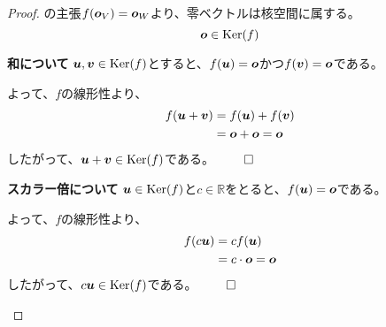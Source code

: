 \documentclass[../../../topic_linear-algebra]{subfiles}
\begin{document}
\begin{proof}
  の主張$f(\vb*{o}_V) = \vb*{o}_W$より、零ベクトルは核空間に属する。
  \begin{equation*}
    \vb*{o} \in \operatorname{Ker}(f)
  \end{equation*}

  \begin{subpattern}{\bfseries 和について}
    $\vb*{u}, \vb*{v} \in \operatorname{Ker}(f)$とすると、$f(\vb*{u}) = \vb*{o}$かつ$f(\vb*{v}) = \vb*{o}$である。

    よって、$f$の線形性より、
    \begin{align*}
      f(\vb*{u} + \vb*{v}) & = f(\vb*{u}) + f(\vb*{v})     \\
                           & = \vb*{o} + \vb*{o} = \vb*{o}
    \end{align*}
    したがって、$\vb*{u} + \vb*{v} \in \operatorname{Ker}(f)$である。 $\qed$
  \end{subpattern}

  \begin{subpattern}{\bfseries スカラー倍について}
    $\vb*{u} \in \operatorname{Ker}(f)$と$c \in \mathbb{R}$をとると、$f(\vb*{u}) = \vb*{o}$である。

    よって、$f$の線形性より、
    \begin{align*}
      f(c \vb*{u}) & = c f(\vb*{u})              \\
                   & = c \cdot \vb*{o} = \vb*{o}
    \end{align*}
    したがって、$c \vb*{u} \in \operatorname{Ker}(f)$である。 $\qed$
  \end{subpattern}
\end{proof}
\end{document}
